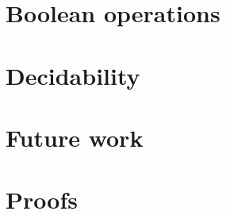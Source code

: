 \documentclass[orivec]{llncs}
\begin{document}
\section{Boolean operations}\label{sec:boolean-operations}


\section{Decidability}\label{sec:decidability}

\section{Future work}\label{sec:future-work}



\appendix
\section{Proofs}




\end{document}
